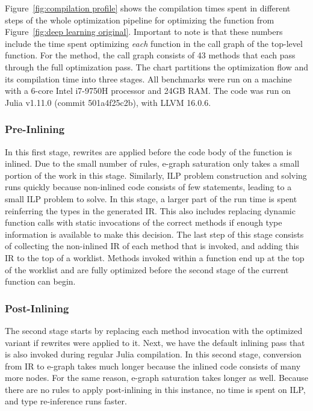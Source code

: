Figure~\ref{fig:compilation profile} shows the compilation times spent in different steps of the whole optimization pipeline for optimizing the  function from Figure~\ref{fig:deep learning original}.
Important to note is that these numbers include the time spent optimizing \emph{each} function in the call graph of the top-level function.
For the  method, the call graph consists of 43 methods that each pass through the full optimization pass.
The chart partitions the optimization flow and its compilation time into three stages.
All benchmarks were run on a machine with a 6-core Intel i7-9750H processor and 24GB RAM.
The code was run on Julia v1.11.0 (commit 501a4f25c2b), with LLVM 16.0.6.

\subsubsection{Pre-Inlining} In this first stage, rewrites are applied before the code body of the function is inlined.
Due to the small number of rules, e-graph saturation only takes a small portion of the work in this stage.
Similarly, ILP problem construction and solving runs quickly because non-inlined code consists of few statements, leading to a small ILP problem to solve.
In this stage, a larger part of the run time is spent reinferring the types in the generated IR.
This also includes replacing dynamic function calls with static invocations of the correct methods if enough type information is available to make this decision.
The last step of this stage consists of collecting the non-inlined IR of each method that is invoked, and adding this IR to the top of a worklist.
Methods invoked within a function end up at the top of the worklist and are fully optimized before the second stage of the current function can begin.

\subsubsection{Post-Inlining} The second stage starts by replacing each method invocation with the optimized variant if rewrites were applied to it.
Next, we have the default inlining pass that is also invoked during regular Julia compilation.
In this second stage, conversion from IR to e-graph takes much longer because the inlined code consists of many more nodes.
For the same reason, e-graph saturation takes longer as well.
Because there are no rules to apply post-inlining in this instance, no time is spent on ILP, and type re-inference runs faster.

